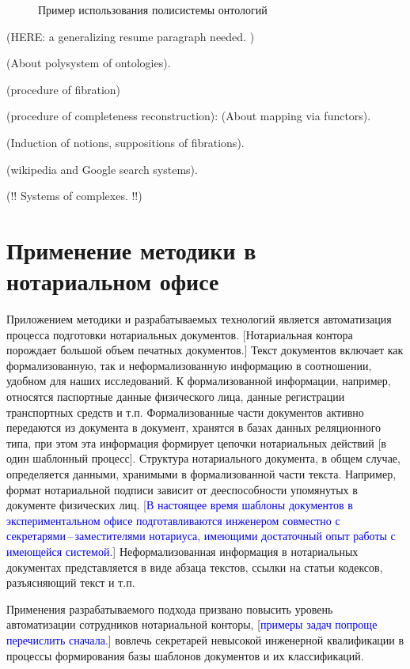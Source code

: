 \documentclass[utf8]{../IncArticle}
\newcommand{\e}[2][fcolor]{\textcolor{pcolor}{[}\textcolor{#1}{#2}\textcolor{pcolor}{]}}
\begin{document}
\begin{figure}
\begin{center}
\sf
\def\svgwidth{0.7\linewidth}

\end{center}
\caption{Пример использования полисистемы онтологий}
\label{OPSA}
\end{figure}



(HERE: a generalizing resume paragraph needed.  )

(About polysystem of ontologies).

(procedure of fibration)

(procedure of completeness reconstruction): (About mapping via functors).

(Induction of notions, suppositions of fibrations).

(wikipedia and Google search systems).

(!! Systems of complexes. !!)

\section{Применение методики в нотариальном офисе}

Приложением методики и разрабатываемых технологий является
автоматизация процесса подготовки нотариальных документов.
\e{Нотариальная контора порождает большой объем печатных документов.}
Текст документов включает как формализованную, так и неформализованную
информацию в соотношении, удобном для наших исследований.  К
формализованной информации, например, относятся паспортные данные
физического лица, данные регистрации транспортных средств и т.п.
Формализованные части документов активно передаются из документа в
документ, хранятся в базах данных реляционного типа, при этом эта
информация формирует цепочки нотариальных действий \e{в один шаблонный
процесс}.  Структура нотариального документа, в общем случае,
определяется данными, хранимыми в формализованной части текста.
Например, формат нотариальной подписи зависит от дееспособности
упомянутых в документе физических лиц.  \e[blue]{В настоящее время шаблоны
документов в экспериментальном офисе подготавливаются инженером
совместно с секретарями\,--\,заместителями нотариуса, имеющими
достаточный опыт работы с имеющейся системой.} Неформализованная
информация в нотариальных документах представляется в виде абзаца
текстов, ссылки на статьи кодексов, разъясняющий текст и т.п.

Применения разрабатываемого подхода призвано повысить уровень
автоматизации сотрудников нотариальной конторы, \e[blue]{примеры
  задач попроще перечислить сначала.} вовлечь секретарей
невысокой инженерной квалификации в процессы формирования базы шаблонов
документов и их классификаций.
\end{document}
